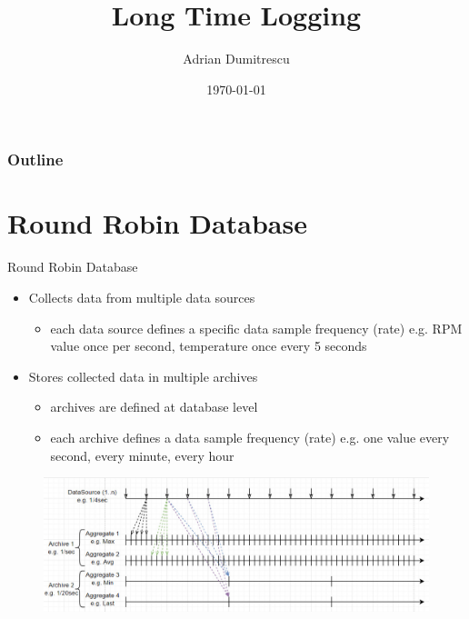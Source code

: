 \documentclass[t 9pt]{beamer}
\title{Long Time Logging}
\subtitle{}
\author{Adrian Dumitrescu}
\institute{ThermoFisher Scientific}
\date{\today}
\begin{document}
    \begin{frame}
        \titlepage
    \end{frame}

    \begin{frame}
        \frametitle{Outline}
        \tableofcontents
    \end{frame}

    \section{Round Robin Database}

    \begin{frame}[t]{Round Robin Database}
        \begin{itemize}
            \item Collects data from multiple data sources
            \begin{itemize}
                \item each data source defines a specific data sample frequency (rate) e.g. RPM value once per second, temperature once every 5 seconds
            \end{itemize}
            \item Stores collected data in multiple archives
            \begin{itemize}
                \item archives are defined at database level
                \item each archive defines a data sample frequency (rate) e.g. one value every second, every minute, every hour
            \end{itemize}
        \end{itemize}
        \begin{figure}
            \includegraphics[scale=0.35]{rrdb-structure.jpg}
        \end{figure}
    \end{frame}
\end{document}
